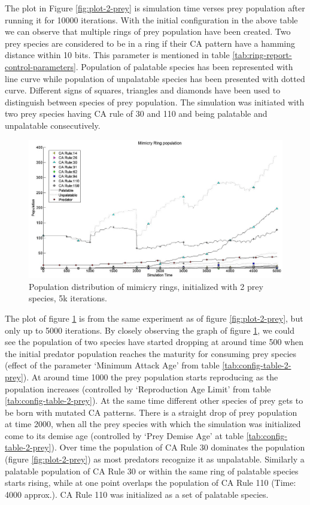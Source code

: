 The plot in Figure \ref{fig:plot-2-prey} is simulation time verses prey population after running it for 10000 iterations. With the initial configuration in the above table we can observe that multiple rings of prey population have been created. Two prey species are considered to be in a ring if their CA pattern have a hamming distance within 10 bits. This parameter is mentioned in table \ref{tab:ring-report-control-parameters}. Population of palatable species has been represented with line curve while population of unpalatable species has been presented with dotted curve. Different signs of squares, triangles and diamonds have been used to distinguish between species of prey population. The simulation was initiated with two prey species having CA rule of 30 and 110 and being palatable and unpalatable consecutively.

\begin{figure}[H]
	\centering
	\includegraphics[scale=0.40]{images/simTime5k-2Prey}
	\caption[Population distribution of mimicry rings (2 prey species, 5k iterations)]{Population distribution of mimicry rings, initialized with 2 prey species, 5k iterations.}
	\label{fig:plot-2-prey-5k}
\end{figure}

The plot of figure \ref{fig:plot-2-prey-5k} is from the same experiment as of figure \ref{fig:plot-2-prey}, but only up to 5000 iterations. By closely observing the graph of figure \ref{fig:plot-2-prey-5k}, we could see the population of two species have started dropping at around time 500 when the initial predator population reaches the maturity for consuming prey species (effect of the parameter `Minimum Attack Age' from table \ref{tab:config-table-2-prey}). At around time 1000 the prey population starts reproducing as the population increases (controlled by `Reproduction Age Limit' from table \ref{tab:config-table-2-prey}). At the same time different other species of prey gets to be born with mutated CA patterns. There is a straight drop of prey population at time 2000, when all the prey species with which the simulation was initialized come to its demise age (controlled by `Prey Demise Age' at table \ref{tab:config-table-2-prey}). Over time the population of CA Rule 30 dominates the population (figure \ref{fig:plot-2-prey}) as most predators recognize it as unpalatable. Similarly a palatable population of CA Rule 30 or within the same ring of palatable species starts rising, while at one point overlaps the population of CA Rule 110 (Time: 4000 approx.). CA Rule 110 was initialized as a set of palatable species.

